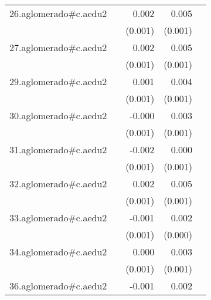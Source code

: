 {\begin{longtable}{l*{4}{D{.}{.}{-1}}}
\addlinespace
26.aglomerado#c.aedu2&                     &       0.002         &       0.005\sym{***}&                     \\
            &                     &     (0.001)         &     (0.001)         &                     \\
\addlinespace
27.aglomerado#c.aedu2&                     &       0.002         &       0.005\sym{***}&                     \\
            &                     &     (0.001)         &     (0.001)         &                     \\
\addlinespace
29.aglomerado#c.aedu2&                     &       0.001         &       0.004\sym{***}&                     \\
            &                     &     (0.001)         &     (0.001)         &                     \\
\addlinespace
30.aglomerado#c.aedu2&                     &      -0.000         &       0.003\sym{***}&                     \\
            &                     &     (0.001)         &     (0.001)         &                     \\
\addlinespace
31.aglomerado#c.aedu2&                     &      -0.002         &       0.000         &                     \\
            &                     &     (0.001)         &     (0.001)         &                     \\
\addlinespace
32.aglomerado#c.aedu2&                     &       0.002         &       0.005\sym{***}&                     \\
            &                     &     (0.001)         &     (0.001)         &                     \\
\addlinespace
33.aglomerado#c.aedu2&                     &      -0.001         &       0.002\sym{***}&                     \\
            &                     &     (0.001)         &     (0.000)         &                     \\
\addlinespace
34.aglomerado#c.aedu2&                     &       0.000         &       0.003\sym{***}&                     \\
            &                     &     (0.001)         &     (0.001)         &                     \\
\addlinespace
36.aglomerado#c.aedu2&                     &      -0.001         &       0.002\sym{**} &                     \\

\end{longtable}}
